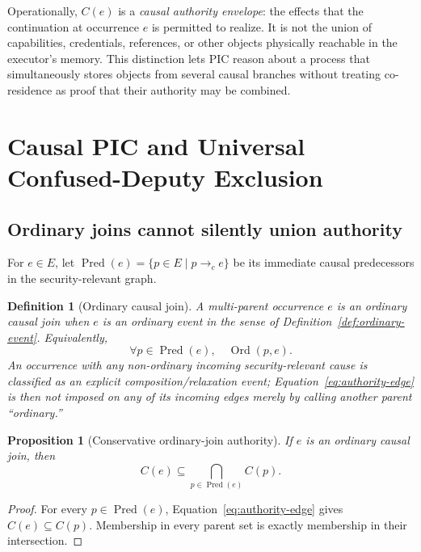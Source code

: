 \documentclass[10pt,twocolumn]{article}
\newcommand{\Ord}{\operatorname{Ord}}
\newcommand{\Pred}{\operatorname{Pred}}
\newtheorem{definition}{Definition}
\newtheorem{proposition}{Proposition}
\begin{document}
Operationally, $C(e)$ is a \emph{causal authority envelope}: the effects that
the continuation at occurrence $e$ is permitted to realize.  It is not the
union of capabilities, credentials, references, or other objects physically
reachable in the executor's memory.  This distinction lets PIC reason about a
process that simultaneously stores objects from several causal branches
without treating co-residence as proof that their authority may be combined.



\section{Causal PIC and Universal Confused-Deputy Exclusion}
\label{sec:universal-cda}

\subsection{Ordinary joins cannot silently union authority}

For $e\in E$, let $\Pred(e)=\{p\in E\mid p\to_c e\}$ be its immediate causal
predecessors in the security-relevant graph.

\begin{definition}[Ordinary causal join]
A multi-parent occurrence $e$ is an \emph{ordinary causal join} when $e$ is an
ordinary event in the sense of Definition~\ref{def:ordinary-event}.  Equivalently,
\begin{equation}
  \forall p\in\Pred(e),\quad \Ord(p,e).
\end{equation}
An occurrence with any non-ordinary incoming security-relevant cause is
classified as an explicit composition/relaxation event; Equation~\eqref{eq:authority-edge}
is then not imposed on any of its incoming edges merely by calling another
parent ``ordinary.''
\end{definition}

\begin{proposition}[Conservative ordinary-join authority]
\label{prop:ordinary-join}
If $e$ is an ordinary causal join, then
\begin{equation}
  C(e)\subseteq\bigcap_{p\in\Pred(e)} C(p).
  \label{eq:join-intersection}
\end{equation}
\end{proposition}

\begin{proof}
For every $p\in\Pred(e)$, Equation~\eqref{eq:authority-edge} gives
$C(e)\subseteq C(p)$.  Membership in every parent set is exactly membership in
their intersection.
\end{proof}
\end{document}
